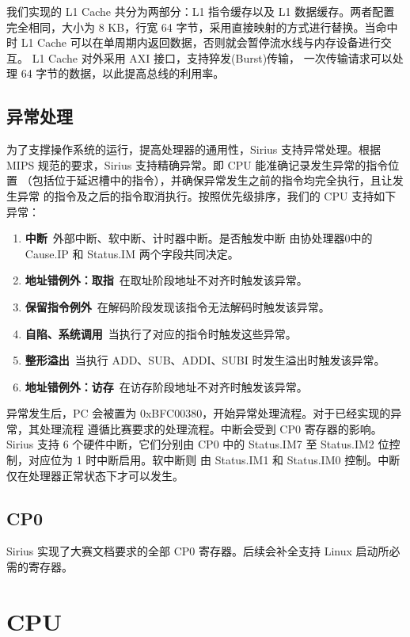 \documentclass[blue,normal,cn,hide]{elegantbook}
\begin{document}
我们实现的 L1 Cache 共分为两部分：L1 指令缓存以及 L1 数据缓存。两者配置
完全相同，大小为 8 KB，行宽 64 字节，采用直接映射的方式进行替换。当命中时
L1 Cache 可以在单周期内返回数据，否则就会暂停流水线与内存设备进行交互。
L1 Cache 对外采用 AXI 接口，支持猝发(Burst)传输，
一次传输请求可以处理 64 字节的数据，以此提高总线的利用率。

\section{异常处理}

为了支撑操作系统的运行，提高处理器的通用性，Sirius 支持异常处理。根据 MIPS 
规范的要求，Sirius 支持精确异常。即 CPU 能准确记录发生异常的指令位置
（包括位于延迟槽中的指令），并确保异常发生之前的指令均完全执行，且让发生异常
的指令及之后的指令取消执行。按照优先级排序，我们的 CPU 支持如下异常：

\begin{enumerate}
    \item \textbf{中断}\ 外部中断、软中断、计时器中断。是否触发中断
    由协处理器0中的 Cause.IP 和 Status.IM 两个字段共同决定。
    \item \textbf{地址错例外：取指}\ 在取址阶段地址不对齐时触发该异常。
    \item \textbf{保留指令例外}\ 在解码阶段发现该指令无法解码时触发该异常。
    \item \textbf{自陷、系统调用}\ 当执行了对应的指令时触发这些异常。
    \item \textbf{整形溢出}\ 当执行 ADD、SUB、ADDI、SUBI 时发生溢出时触发该异常。
    \item \textbf{地址错例外：访存}\ 在访存阶段地址不对齐时触发该异常。
\end{enumerate}

异常发生后，PC 会被置为 0xBFC00380，开始异常处理流程。对于已经实现的异常，其处理流程
遵循比赛要求的处理流程。中断会受到 CP0 寄存器的影响。Sirius 支持 6 个硬件中断，它们分别由 CP0 
中的 Status.IM7 至 Status.IM2 位控制，对应位为 1 时中断启用。软中断则
由 Status.IM1 和 Status.IM0 控制。中断仅在处理器正常状态下才可以发生。

\section{CP0}

Sirius 实现了大赛文档要求的全部 CP0 寄存器。后续会补全支持 Linux 启动所必需的寄存器。

\chapter{CPU}
\end{document}

